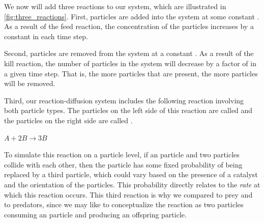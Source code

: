 \begin{qbox}\end{qbox}

We now will add three reactions to our system, which are illustrated in \autoref{fig:three_reactions}. First,  particles are added into the system at some constant  . As a result of the feed reaction, the concentration of the  particles increases by a constant in each time step.\\

\begin{note}\end{note}

Second,  particles are removed from the system at a constant  . As a result of the kill reaction, the number of  particles in the system will decrease by a factor of  in a given time step. That is, the more  particles that are present, the more  particles will be removed.

Third, our reaction-diffusion system includes the following reaction involving both particle types. The particles on the left side of this reaction are called  and the particles on the right side are called .

\begin{center}
$A + 2B \rightarrow 3B$
\end{center}

To simulate this reaction on a particle level, if an  particle and two  particles collide with each other, then the  particle has some fixed probability of being replaced by a third  particle, which could vary based on the presence of a catalyst and the orientation of the particles. This probability directly relates to the \textit{rate} at which this reaction occurs. This third reaction is why we compared  to prey and  to predators, since we may like to conceptualize the reaction as two  particles consuming an  particle and producing an offspring  particle.\\

